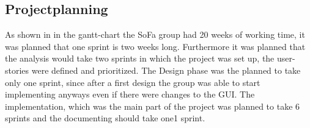 \subsection{Projectplanning}
As shown in in the gantt-chart the SoFa group had 20 weeks of working time, it was planned that one sprint is two weeks long. Furthermore it was planned that the analysis would take two sprints in which the project was set up, the user-stories were defined and prioritized. The Design phase was the planned to take only one sprint, since after a first design the group was able to start implementing anyways even if there were changes to the GUI.
The implementation, which was the main part of the project was planned to take 6 sprints and the documenting should take one1 sprint.